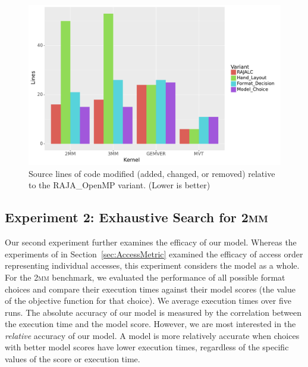 \documentclass[sigconf,review=true]{acmart}
\begin{document}
\begin{figure}
	\includegraphics[width=\columnwidth]{PolybenchSLOC.pdf}
	\caption{Source lines of code modified (added, changed, or removed) relative to the RAJA\_OpenMP variant. (Lower is better)}
	\label{PolybenchSLOC}  
\end{figure}


\subsection{Experiment 2: Exhaustive Search for \textsc{2mm}}

Our second experiment further examines the efficacy of our model. 
Whereas the experiments of in Section~\ref{sec:AccessMetric} examined the efficacy of access order representing individual accesses, this experiment considers the model as a whole.
For the \textsc{2mm} benchmark, we evaluated the performance of all possible format choices and compare their execution times against their model scores (the value of the objective function for that choice).
We average execution times over five runs.
The absolute accuracy of our model is measured by the correlation between the execution time and the model score.
However, we are most interested in the \textit{relative} accuracy of our model.
A model is more relatively accurate when choices with better model scores have lower execution times, regardless of the specific values of the score or execution time.
\end{document}
